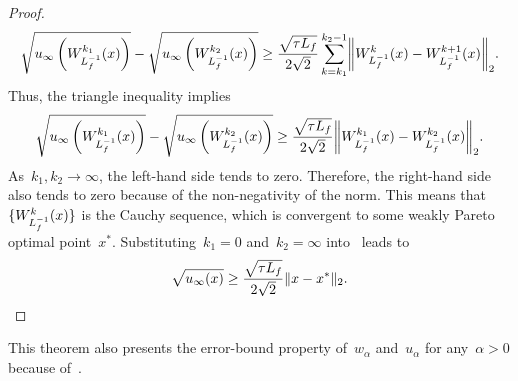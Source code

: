 \documentclass[../main]{subfiles}
\begin{document}
\begin{proof}
    \begin{equation}
        \sqrt{u_\infty\left(W_{L_f^{-1}}^{k_1}(x)\right)} - \sqrt{u_\infty\left(W_{L_f^{-1}}^{k_2}(x)\right)} \ge \frac{\sqrt{\tau L_f}}{2 \sqrt{2}} \sum_{k = k_1}^{k_2 - 1} \norm*{W_{L_f^{-1}}^k(x) - W_{L_f^{-1}}^{k + 1}(x)}_2
        .\end{equation}
    Thus, the triangle inequality implies
    \begin{equation} \label{eq:proximal_PL_MO_EB:sq_gap_Cauchy}
        \sqrt{u_\infty\left(W_{L_f^{-1}}^{k_1}(x)\right)} - \sqrt{u_\infty\left(W_{L_f^{-1}}^{k_2}(x)\right)} \ge \frac{\sqrt{\tau L_f}}{2 \sqrt{2}} \norm*{W_{L_f^{-1}}^{k_1}(x) - W_{L_f^{-1}}^{k_2}(x)}_2
        .\end{equation}
    As~$k_1, k_2 \to \infty$, the left-hand side tends to zero.
    Therefore, the right-hand side also tends to zero because of the non-negativity of the norm.
    This means that~$\lbrace W_{L_f^{-1}}^k(x)\rbrace$ is the Cauchy sequence, which is convergent to some weakly Pareto optimal point~$x^*$.
    Substituting~$k_1 = 0$ and~$k_2 = \infty$ into~ leads to
    \begin{equation}
        \sqrt{u_\infty(x)} \ge \frac{\sqrt{\tau L_f}}{2 \sqrt{2}} \lVert x - x^*\rVert_2
        .\end{equation}
\end{proof}
This theorem also presents the error-bound property of~$w_\alpha$ and~$u_\alpha$ for any~$\alpha > 0$ because of~.
\end{document}
